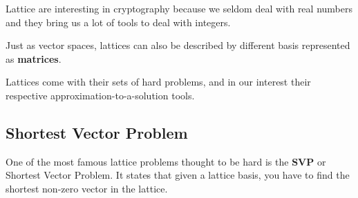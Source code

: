 \documentclass[a4paper,11pt]{article}
\begin{document}
Lattice are interesting in cryptography because we seldom deal with real numbers and they bring us a lot of tools to deal with integers.

Just as vector spaces, lattices can also be described by different basis represented as \textbf{matrices}. 

Lattices come with their sets of hard problems, and in our interest their respective approximation-to-a-solution tools.

\subsection{Shortest Vector Problem}

One of the most famous lattice problems thought to be hard is the \textbf{SVP} or Shortest Vector Problem. It states that given a lattice basis, you have to find the shortest non-zero vector in the lattice.
\end{document}
